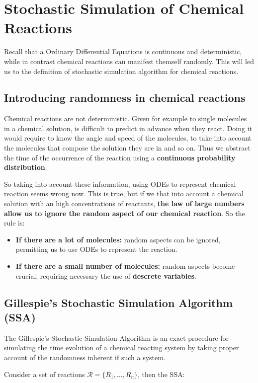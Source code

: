 \chapter{Stochastic Simulation of Chemical Reactions}

Recall that a Ordinary Differential Equations is continuous and deterministic, while in contrast chemical reactions can manifest themself randomly. This will led us to the definition of stochastic simulation algorithm for chemical reactions. 

\section{Introducing randomness in chemical reactions}
Chemical reactions are not deterministic. Given for example to single molecules in a chemical solution, is difficult to predict in advance when they react. Doing it would require to know the angle and speed of the molecules, to take into account the molecules that compose the solution they are in and so on. Thus we abstract the time of the occurrence of the reaction using a \textbf{continuous probability distribution}.\par
So taking into account these information, using ODEs to represent chemical reaction seems wrong now. This is true, but if we that into account a chemical solution with an high concentrations of reactants, \textbf{the law of large numbers allow us to ignore the random aspect of our chemical reaction}. So the rule is:

\begin{itemize}
    \item \textbf{If there are a lot of molecules:} random aspects can be ignored, permitting us to use ODEs to represent the reaction.
    \item \textbf{If there are a small number of molecules:} random aspects become crucial, requiring necessary the use of \textbf{descrete variables}.
\end{itemize}

\section{Gillespie's Stochastic Simulation Algorithm (SSA)}
The Gillespie's Stochastic Simulation Algorithm is an exact procedure for simulating the time evolution of a chemical reacting system by taking proper account of the randomness inherent if such a system. \par
Consider a set of reactions $\mathcal{R} = \{R_{1}, ... , R_{n}\}$, then the SSA:

